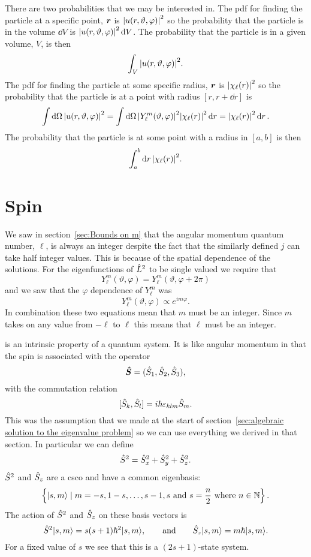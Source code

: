 \documentclass[a4paper]{article}
\renewcommand{\ket}[1]{\vert {#1} \rangle}
\newcommand{\st}{\mid}
\newcommand{\vecoperator}[1]{\vv{\operator{#1}}}
\theoremstyle{definition}
\begin{document}
    There are two probabilities that we may be interested in.
    The \gls{pdf} for finding the particle at a specific point, \(\bm{r}\) is \(\abs{u(r, \vartheta, \varphi)}^2\) so the probability that the particle is in the volume \(\dd{V}\) is \(\abs{u(r, \vartheta, \varphi)}^2\dd{V}\).
    The probability that the particle is in a given volume, \(V\), is then
    \[\int_V \abs{u(r, \vartheta, \varphi)}^2.\]
    The \gls{pdf} for finding the particle at some specific radius, \(\bm{r}\) is \(\abs{\chi_\ell(r)}^2\) so the probability that the particle is at a point with radius \([r, r + \dd{r}]\) is
    \[\int\dd{\Omega}\abs{u(r, \vartheta, \varphi)}^2 = \int\dd{\Omega}\abs{Y_\ell^m(\vartheta, \varphi)}^2\abs{\chi_\ell(r)}^2\dd{r} = \abs{\chi_\ell(r)}^2\dd{r}.\]
    The probability that the particle is at some point with a radius in \([a, b]\) is then
    \[\int_a^b\dd{r}\abs{\chi_\ell(r)}^2.\]
    
    \section{Spin}
    We saw in section~\ref{sec:Bounds on m} that the angular momentum quantum number, \(\ell\), is always an integer despite the fact that the similarly defined \(j\) can take half integer values.
    This is because of the spatial dependence of the solutions.
    For the eigenfunctions of \(\hat{L}^2\) to be single valued we require that
    \[Y_\ell^m(\vartheta, \varphi) = Y_\ell^m(\vartheta, \varphi + 2\pi)\]
    and we saw that the \(\varphi\) dependence of \(Y_\ell^m\) was
    \[Y_\ell^m(\vartheta, \varphi) \propto e^{im\varphi}.\]
    In combination these two equations mean that \(m\) must be an integer.
    Since \(m\) takes on any value from \(-\ell\) to \(\ell\) this means that \(\ell\) must be an integer.
    
     is an intrinsic property of a quantum system.
    It is like angular momentum in that the spin is associated with the operator
    \[\vecoperator{S} = (\operator{S}_1, \operator{S}_2, \operator{S}_3),\]
    with the commutation relation
    \[[\hat{S}_k, \hat{S}_l] = i\hbar\varepsilon_{klm}\hat{S}_m.\]
    This was the assumption that we made at the start of section~\ref{sec:algebraic solution to the eigenvalue problem} so we can use everything we derived in that section.
    In particular we can define 
    \[\hat{S}^2 = \hat{S}_x^2 + \hat{S}_y^2 + \hat{S}_z^2.\]
    \(\hat{S}^2\) and \(\hat{S}_z\) are a \gls{csco} and have a common eigenbasis:
    \[\left\{\ket{s, m}\st m = -s, 1 - s, \dotsc, s - 1, s~\text{and}~s = \frac{n}{2}~\text{where}~n\in\naturals\right\}.\]
    The action of \(\hat{S}^2\) and \(\hat{S}_z\) on these basis vectors is
    \[\operator{S}^2\ket{s, m} = s(s + 1)\hbar^2\ket{s, m}, \qquad\text{and}\qquad \operator{S}_z\ket{s, m} = m\hbar\ket{s, m}.\]
    For a fixed value of \(s\) we see that this is a \((2s + 1)\)-state system.
    
\end{document}
